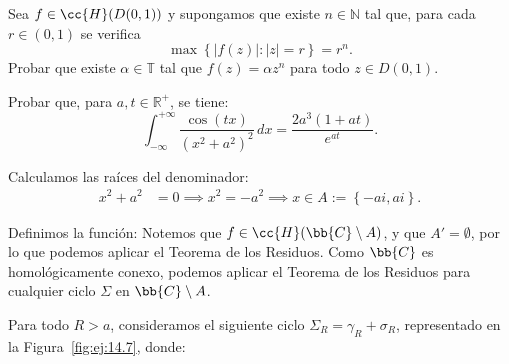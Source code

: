 \documentclass[12pt]{article}
\begin{document}
    \begin{ejercicio}[2.5 puntos]
        Sea $f \in \cc{H}(D(0, 1))$ y supongamos que existe $n \in \mathbb{N}$ tal que, para cada $r \in (0, 1)$ se verifica
        \[
            \max\left\{ |f(z)| : |z| = r \right\} = r^n.
        \]
        Probar que existe $\alpha \in \mathbb{T}$ tal que $f(z) = \alpha z^n$ para todo $z \in D(0, 1)$.
    \end{ejercicio}

    \newpage
    \setcounter{ejercicio}{0}


    \begin{ejercicio}[2.5 puntos]\label{ej:14.7}
        Probar que, para $a, t \in \mathbb{R}^+$, se tiene:
        \[
            \int_{-\infty}^{+\infty} \frac{\cos(tx)}{(x^2 + a^2)^2} \, dx = \frac{2a^3 (1 + at)}{e^{at}}.
        \]




        Calculamos las raíces del denominador:
    \begin{align*}
        x^2 + a^2 &= 0 \implies x^2 = -a^2 \implies x\in A:=\left\{-ai, ai\right\}.
    \end{align*}

    Definimos la función:
    Notemos que $f\in \cc{H}(\bb{C}\setminus A)$, y que $A'=\emptyset$, por lo que podemos aplicar el Teorema de los Residuos. Como $\bb{C}$ es homológicamente conexo, podemos aplicar el Teorema de los Residuos para cualquier ciclo $\Sigma$ en $\bb{C}\setminus A$.

    Para todo $R > a$, consideramos el siguiente ciclo $\Sigma_R = \gamma_R + \sigma_R$, representado en la Figura~\ref{fig:ej:14.7}, donde:
    \begin{figure}
        \centering
\end{figure}
\end{ejercicio}
\end{document}
